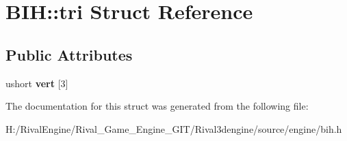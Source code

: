 \hypertarget{struct_b_i_h_1_1tri}{}\section{B\+IH\+:\+:tri Struct Reference}
\label{struct_b_i_h_1_1tri}
\subsection*{Public Attributes}
\begin{DoxyCompactItemize}
\item 
\mbox{\label{struct_b_i_h_1_1tri_a2df3538905ac718232d28f3a4748ed49}} 
ushort {\bfseries vert} \mbox{[}3\mbox{]}
\end{DoxyCompactItemize}


The documentation for this struct was generated from the following file\+:\begin{DoxyCompactItemize}
\item 
H\+:/\+Rival\+Engine/\+Rival\+\_\+\+Game\+\_\+\+Engine\+\_\+\+G\+I\+T/\+Rival3dengine/source/engine/bih.\+h\end{DoxyCompactItemize}
